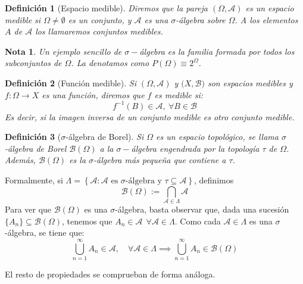 \documentclass[11pt, a4paper]{article}
\theoremstyle{theorem-style}
\theoremstyle{definition-style}
\newtheorem{ndef}{Definición}[section]
\theoremstyle{remark-style}
\newtheorem*{nota}{Nota}
\theoremstyle{example-style}
\begin{document}
\begin{ndef}[Espacio medible] Diremos que la pareja $(\Omega, \mathcal A)$ es un espacio medible si $\Omega \ne \emptyset$ es un conjunto, y $\mathcal A$ es una $\sigma$-álgebra sobre $\Omega$. A los elementos $A$ de $\mathcal{A}$ los llamaremos conjuntos medibles.
\end{ndef}

\begin{nota}
  Un ejemplo sencillo de $\sigma-$álgebra es la familia formada por todos los subconjuntos de $\Omega$. La denotamos como $P(\Omega) \equiv 2^\Omega$.
\end{nota}

\begin{ndef}[Función medible]
  Si $(\Omega,\mathcal{A}) $ y $(X,\mathcal{B)}$ son espacios medibles y \mbox{$f: \Omega \to X$} es una función, diremos que $f$ es medible si:
  \[
    f^{-1}(B) \in \mathcal A, \ \forall B \in \mathcal{B}
  \]
  Es decir, si la imagen inversa de un conjunto medible es otro conjunto medible.
\end{ndef}

\begin{ndef}[$\sigma$-álgebra de Borel] Si $\Omega$ es un espacio topológico, se llama $\sigma$-álgebra de Borel $\mathcal B(\Omega)$ a la $\sigma-$álgebra engendrada por la topología $\tau$ de $\Omega$. Además, $\mathcal B(\Omega)$ es la $\sigma$-álgebra más pequeña que contiene a $\tau$.
\end{ndef}

Formalmente, si $\Lambda = \left\{ \mathcal A : \mathcal A \text{ es } \sigma \text{-álgebra y } \tau \subseteq \mathcal A \right\}$, definimos $$\mathcal B(\Omega) := \bigcap_{\mathcal A \in \Lambda} \mathcal A$$ 
Para ver que $\mathcal B(\Omega)$ es una $\sigma$-álgebra, basta observar que, dada una sucesión \mbox{$\{A_n\} \subseteq \mathcal B(\Omega)$}, tenemos que $A_n \in \mathcal A \ \ \forall \mathcal A \in \Lambda$. Como cada $\mathcal A \in \Lambda$ es una $\sigma$-álgebra, se tiene que: $$\bigcup_{n=1}^\infty A_n \in \mathcal A, \quad \forall \mathcal A \in \Lambda \implies \bigcup_{n=1}^\infty A_n \in \mathcal B(\Omega)$$

El resto de propiedades se comprueban de forma análoga.
\end{document}
